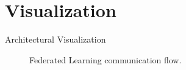 
\section{Visualization}

\begin{frame}[plain]
    \centering
    
\end{frame}

\begin{frame}{Architectural Visualization}
    \begin{figure}
        \centering
        
        \caption{Federated Learning communication flow.}
    \end{figure}
\end{frame}
